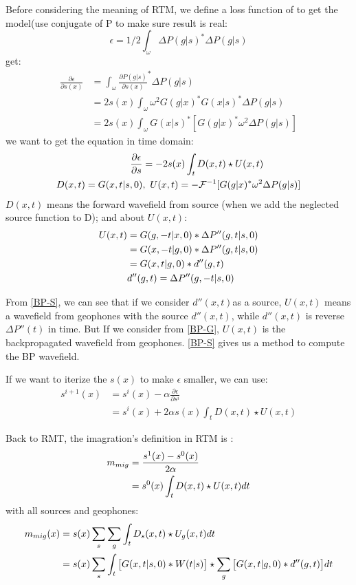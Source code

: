 \documentclass[a4paper]{article}
\begin{document}
	Before considering the meaning of RTM, we define a loss function of to get the model(use conjugate of P to make sure result is real:
	$$\epsilon=1/2 \int_{\omega}\Delta P(g|s)^* \Delta P(g|s) $$
	get:
	\begin{align}
		\frac{\partial \epsilon}{\partial s(x)}
		&=\int_{\omega}\frac{\partial P(g|s)}{\partial s(x)}^* \Delta P(g|s)\\
		&=2s(x)\int_{\omega}\omega^2G(g|x)^*G(x|s)^* \Delta P(g|s) \\
		&=2s(x)\int_{\omega}G(x|s)^* [G(g|x)^* \omega^2\Delta P(g|s)]
	\end{align}
	we want to get the equation in time domain:
	\begin{align}
		\frac{\partial \epsilon}{\partial s}
		&=-2s(x)\int_{t} D(x,t) \star U(x,t)\\
		D(x,t)=G(x,t|s,0)&,\ U(x,t)=-\mathcal{F}^{-1}[G(g|x)^* \omega^2\Delta P(g|s)] \notag
	\end{align}
	$D(x,t)$ means the forward wavefield from source (when we add the neglected source function to D); and about $U(x,t)$:
	\begin{align}
		U(x,t) 
		& = G(g,-t|x, 0) * \Delta P''(g,t|s,0) \notag\\
		& = G(x,-t|g, 0) * \Delta P''(g,t|s,0) \label{BP-G}\\
		& = G(x,t|g, 0) * d''(g,t)\label{BP-S}\\
		& d''(g,t)= \Delta P''(g,-t|s,0)\notag
	\end{align}

	From \autoref{BP-S}, we can see that if we consider $d''(x,t)$as a source, $U(x,t)$ means a wavefield from geophones with the source $d''(x,t)$, while $d''(x,t)$ is reverse $\Delta P''(t)$ in time. But If we consider from \autoref{BP-G}, $U(x,t)$ is the backpropagated wavefield from geophones. \autoref{BP-S} gives us a method to compute the BP wavefield.\par If we want to iterize the $s(x)$ to make $\epsilon$ smaller, we can use:
	\begin{align}
		s^{i+1}(x) &= s^i(x)-\alpha \frac{\partial \epsilon}{\partial s^i}\\
				   &= s^i(x)+2\alpha s(x)\int_{t} D(x,t) \star U(x,t)
	\end{align}
	$$$$

	Back to RMT, the imagration's definition in RTM is :
		\begin{align}
			m_{mig} &= \frac{s^{1}(x)-s^0(x)}{2\alpha} \notag\\
					&= s^0  	(x)\int_{t} D(x,t) \star U(x,t)dt
		\end{align}
	with all sources and geophones:
		\begin{align}
			m_{mig}(x) &= s(x)\sum_s \sum_g\int_{t} D_s(x,t) \star U_g (x,t)dt \notag\\
					   &= s(x)\sum_s \int_{t} \big[G(x,t|s,0)*W(t|s)\big] \star \sum_g \big[G(x,t|g, 0) * d''(g,t)\big]dt
		\end{align}\par
	
\end{document}
